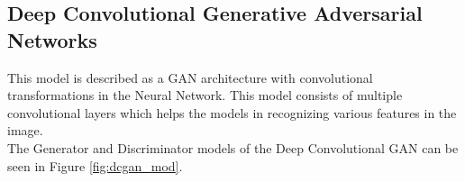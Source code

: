 \documentclass[conference]{IEEEtran}
\begin{document}
\subsection{Deep Convolutional Generative Adversarial Networks}\label{dcgan}

This model is described as a GAN architecture with convolutional transformations in the Neural Network. This model consists of multiple convolutional layers which helps the models in recognizing various features in the image. 
\\
The Generator and Discriminator models of the Deep Convolutional GAN can be seen in Figure \ref{fig:dcgan_mod}.

\begin{figure}
     \centering
     \begin{subfigure}[b]{\columnwidth}
         \centering

\end{subfigure}
\end{figure}
\end{document}
